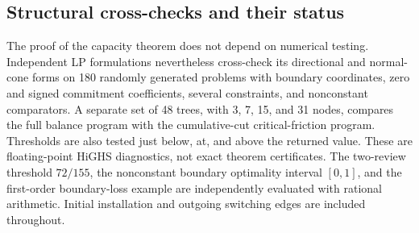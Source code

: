 \subsection{Structural cross-checks and their status}
The proof of the capacity theorem does not depend on numerical testing. Independent LP formulations nevertheless cross-check its directional and normal-cone forms on 180 randomly generated problems with boundary coordinates, zero and signed commitment coefficients, several constraints, and nonconstant comparators. A separate set of 48 trees, with 3, 7, 15, and 31 nodes, compares the full balance program with the cumulative-cut critical-friction program. Thresholds are also tested just below, at, and above the returned value. These are floating-point HiGHS diagnostics, not exact theorem certificates. The two-review threshold $72/155$, the nonconstant boundary optimality interval $[0,1]$, and the first-order boundary-loss example are independently evaluated with rational arithmetic. Initial installation and outgoing switching edges are included throughout.
